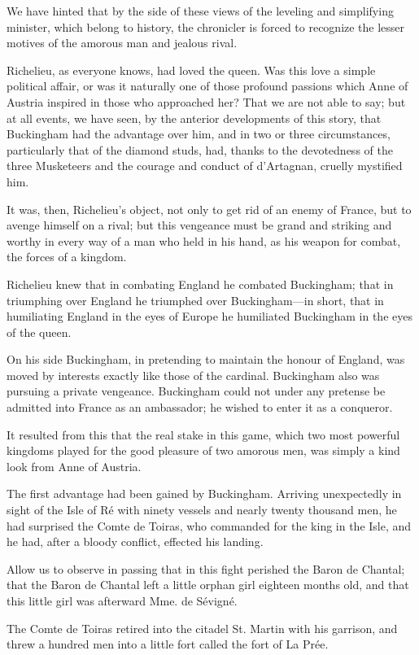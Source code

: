 We have hinted that by the side of these views of the leveling and simplifying minister, which belong to history, the chronicler is forced to recognize the lesser motives of the amorous man and jealous rival. 

Richelieu, as everyone knows, had loved the queen. Was this love a simple political affair, or was it naturally one of those profound passions which Anne of Austria inspired in those who approached her? That we are not able to say; but at all events, we have seen, by the anterior developments of this story, that Buckingham had the advantage over him, and in two or three circumstances, particularly that of the diamond studs, had, thanks to the devotedness of the three Musketeers and the courage and conduct of d'Artagnan, cruelly mystified him. 

It was, then, Richelieu's object, not only to get rid of an enemy of France, but to avenge himself on a rival; but this vengeance must be grand and striking and worthy in every way of a man who held in his hand, as his weapon for combat, the forces of a kingdom. 

Richelieu knew that in combating England he combated Buckingham; that in triumphing over England he triumphed over Buckingham---in short, that in humiliating England in the eyes of Europe he humiliated Buckingham in the eyes of the queen. 

On his side Buckingham, in pretending to maintain the honour of England, was moved by interests exactly like those of the cardinal. Buckingham also was pursuing a private vengeance. Buckingham could not under any pretense be admitted into France as an ambassador; he wished to enter it as a conqueror. 

It resulted from this that the real stake in this game, which two most powerful kingdoms played for the good pleasure of two amorous men, was simply a kind look from Anne of Austria. 

The first advantage had been gained by Buckingham. Arriving unexpectedly in sight of the Isle of Ré with ninety vessels and nearly twenty thousand men, he had surprised the Comte de Toiras, who commanded for the king in the Isle, and he had, after a bloody conflict, effected his landing. 

Allow us to observe in passing that in this fight perished the Baron de Chantal; that the Baron de Chantal left a little orphan girl eighteen months old, and that this little girl was afterward Mme. de Sévigné. 

The Comte de Toiras retired into the citadel St. Martin with his garrison, and threw a hundred men into a little fort called the fort of La Prée. 

